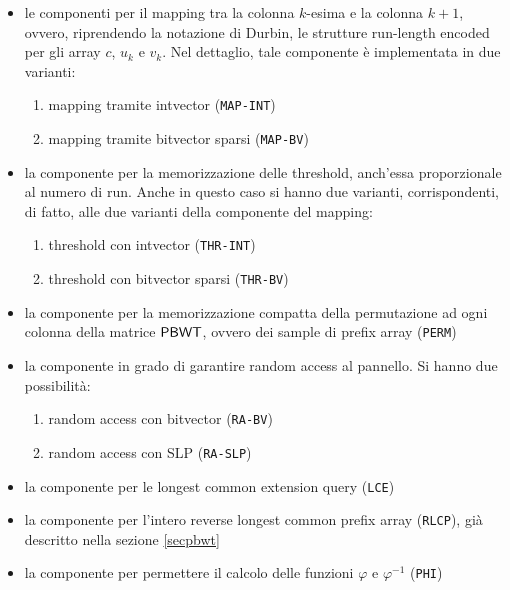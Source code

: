 \begin{itemize}
  \item le componenti per il mapping tra la colonna $k$-esima e la colonna
  $k+1$, ovvero, riprendendo la notazione di Durbin, le strutture run-length
  encoded per gli array $c$, $u_k$ e $v_k$. Nel dettaglio, tale componente è
  implementata in due varianti:
  \begin{enumerate}
    \item mapping tramite intvector (\texttt{MAP-INT})
    \item mapping tramite bitvector sparsi (\texttt{MAP-BV})
  \end{enumerate}
  \item la componente per la memorizzazione delle threshold, anch'essa
  proporzionale al numero di run. Anche in questo caso si hanno due varianti,
  corrispondenti, di fatto, alle due varianti della componente del mapping:
  \begin{enumerate}
    \item threshold con intvector (\texttt{THR-INT})
    \item threshold con bitvector sparsi (\texttt{THR-BV})
  \end{enumerate}
  \item la componente per la memorizzazione compatta della permutazione ad ogni
  colonna 
  della matrice $\mbox{\rm {\sf PBWT}}$, ovvero dei sample di prefix array
  (\texttt{PERM}) 
  \item la componente in grado di garantire random access al
  pannello. Si hanno due possibilità:
  \begin{enumerate}
    \item random access con bitvector (\texttt{RA-BV})
    \item random access con SLP (\texttt{RA-SLP})
  \end{enumerate}
  \item la componente per le longest common extension query
  (\texttt{LCE}) 
  \item la componente per l'intero reverse longest common prefix array
  (\texttt{RLCP}), già descritto nella sezione \ref{secpbwt}
  \item la componente per permettere il calcolo delle funzioni
  $\varphi$ e $\varphi^{-1}$ (\texttt{PHI})
\end{itemize}


